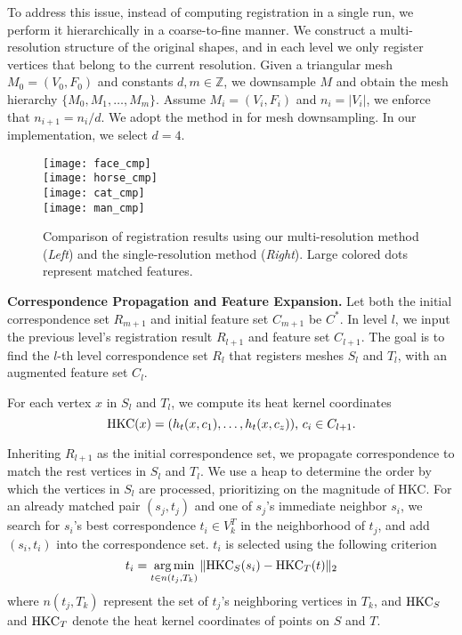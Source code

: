 To address this issue, instead of computing registration in a single run, we perform it hierarchically in a coarse-to-fine manner. We construct a multi-resolution structure of the original shapes, and in each level we only register vertices that belong to the current resolution. Given a triangular mesh $M_0=(V_0,F_0)$ and constants $d, m \in\mathbb{Z}$, we downsample $M$ and obtain the mesh hierarchy $\{M_0,M_1,\ldots,M_m\}$. Assume $M_i=(V_i,F_i)$ and $n_i = |V_i|$, we enforce that $n_{i+1}=n_i/d$. We adopt the method in \cite{Garland:1999} for mesh downsampling. In our implementation, we select $d=4$.

\begin{figure}\centering
  \texttt{[image: face\_cmp]}
  \\
  \texttt{[image: horse\_cmp]}
  \\
  \texttt{[image: cat\_cmp]}
  \\
  \texttt{[image: man\_cmp]}
\caption[Registration results using multi-resolution method.]
 {Comparison of registration results using our multi-resolution method (\emph{Left}) and the single-resolution method \cite{Hou:2011:TVCG} (\emph{Right}).
 Large colored dots represent matched features.}
\label{fig:results}
\end{figure}

\textbf{Correspondence Propagation and Feature Expansion.}
Let both the initial correspondence set $R_{m+1}$ and initial feature set $C_{m+1}$ be $C^*$. In level $l$, we input the previous level's registration result $R_{l+1}$ and feature set $C_{l+1}$. The goal is to find the $l$-th level correspondence set $R_l$ that registers meshes $S_l$ and $T_l$, with an augmented feature set $C_l$.

For each vertex $x$ in $S_l$ and $T_l$, we compute its heat kernel coordinates
\begin{equation}
\operatorname*{HKC}(x)=(h_t(x,c_1),\dots,h_t(x,c_z)) \mbox{, } c_i\in C_{l+1}.
\end{equation}

Inheriting $R_{l+1}$ as the initial correspondence set, we propagate correspondence to match the rest vertices in $S_l$ and $T_l$. We use a heap to determine the order by which the vertices in $S_l$ are processed, prioritizing on the magnitude of HKC. For an already matched pair $(s_j, t_j)$ and one of $s_j$'s immediate neighbor $s_i$, we search for $s_i$'s best correspondence $t_i \in V^T_k$ in the neighborhood of $t_j$, and add $(s_i,t_i)$ into the correspondence set. $t_i$ is selected using the following criterion
\begin{equation}
t_i=\operatorname*{arg\,min}_{t\in n(t_j,T_k)}\|{\operatorname*{HKC}}_S(s_i)-{\operatorname*{HKC}}_T(t)\|_2
\end{equation}
where $n(t_j,T_k)$ represent the set of $t_j$'s neighboring vertices in $T_k$, and $\operatorname*{HKC}_S$ and $\operatorname*{HKC}_T$ denote the heat kernel coordinates of points on $S$ and $T$.

